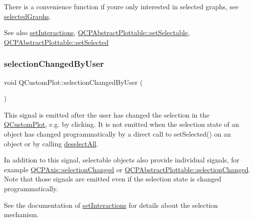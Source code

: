 There is a convenience function if you\textquotesingle{}re only interested in selected graphs, see \mbox{\hyperlink{class_q_custom_plot_ad3547aded026d8a9ae6ef13a69080d06}{selected\+Graphs}}.

\begin{DoxySeeAlso}{See also}
\mbox{\hyperlink{class_q_custom_plot_a5ee1e2f6ae27419deca53e75907c27e5}{set\+Interactions}}, \mbox{\hyperlink{class_q_c_p_abstract_plottable_a22c69299eb5569e0f6bf084877a37dc4}{Q\+C\+P\+Abstract\+Plottable\+::set\+Selectable}}, \mbox{\hyperlink{class_q_c_p_abstract_plottable_afbd5428c2952f59d952e11ab5cd79176}{Q\+C\+P\+Abstract\+Plottable\+::set\+Selected}} 
\end{DoxySeeAlso}
\mbox{\label{class_q_custom_plot_a500c64a109bc773c973ad274f2fa4190}} 
\subsubsection{\texorpdfstring{selection\+Changed\+By\+User}{selectionChangedByUser}}
{\footnotesize\ttfamily void Q\+Custom\+Plot\+::selection\+Changed\+By\+User (\begin{DoxyParamCaption}{ }\end{DoxyParamCaption})\hspace{0.3cm}{\ttfamily [signal]}}

This signal is emitted after the user has changed the selection in the \mbox{\hyperlink{class_q_custom_plot}{Q\+Custom\+Plot}}, e.\+g. by clicking. It is not emitted when the selection state of an object has changed programmatically by a direct call to set\+Selected() on an object or by calling \mbox{\hyperlink{class_q_custom_plot_a9d4808ab925b003054085246c92a257c}{deselect\+All}}.

In addition to this signal, selectable objects also provide individual signals, for example \mbox{\hyperlink{class_q_c_p_axis_a62b598abeee7174a05f9d542cc85b1f5}{Q\+C\+P\+Axis\+::selection\+Changed}} or \mbox{\hyperlink{class_q_c_p_abstract_plottable_a3af66432b1dca93b28e00e78a8c7c1d9}{Q\+C\+P\+Abstract\+Plottable\+::selection\+Changed}}. Note that those signals are emitted even if the selection state is changed programmatically.

See the documentation of \mbox{\hyperlink{class_q_custom_plot_a5ee1e2f6ae27419deca53e75907c27e5}{set\+Interactions}} for details about the selection mechanism.

